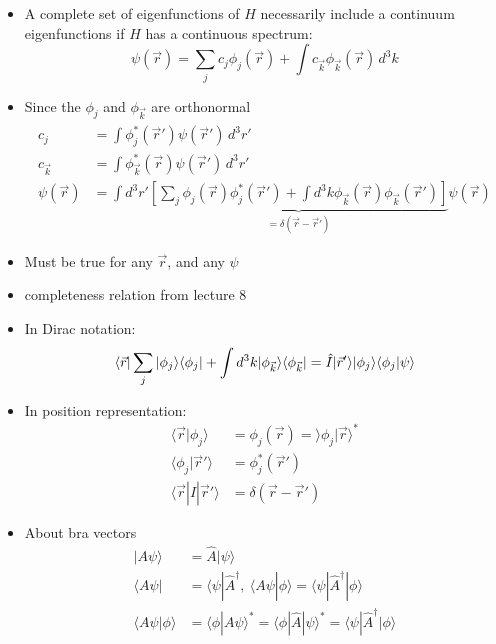 \documentclass[a4paper,11pt,normalem]{article}
\begin{document}
\begin{itemize}
\item
  A complete set of eigenfunctions of \(H\) necessarily include a
  continuum eigenfunctions if \(H\) has a continuous spectrum:
\[
    \psi(\vec{r}) = \sum_j c_j\phi_j(\vec{r}) + \int c_{\vec{k}}\phi_{\vec{k}}(\vec{r})\,d^3k
\]
\item
  Since the \(\phi_j\) and \(\phi_{\vec{k_{}}}\) are orthonormal
\[
    \begin{aligned}
    c_j &= \int \phi_j^*(\vec{r}')\psi(\vec{r}')\,d^3r' \\
    c_{\vec{k}} &= \int \phi_{\vec{k}}^*(\vec{r})\psi(\vec{r}')\,d^3r' \\
    \psi(\vec{r}) &= \int d^3r' \underbrace{\left[\sum_j \phi_j(\vec{r})\phi_j^*(\vec{r}') + \int d^3k \phi_{\vec{k}}(\vec{r})\phi_{\vec{k}}(\vec{r}')\right]}_{=\delta(\vec{r}-\vec{r}')}\psi(\vec{r})
    \end{aligned}
\]
\item
  Must be true for any \(\vec{r}\), and any \(\psi\)
\item
  completeness relation from lecture 8
\item
  In Dirac notation:
\[
    \langle\vec{r}|\sum_j|\phi_j\rangle\langle\phi_j| + \int d^3k |\phi_{\vec{k}}\rangle\langle\phi_{\vec{k}}| = \hat{I}|\vec{r}'\rangle|\phi_j\rangle \\
    \langle\phi_j|\psi\rangle
\]
\item
  In position representation:
\[
    \begin{aligned}
    \langle\vec{r}|\phi_j\rangle &= \phi_j(\vec{r}) = \rangle\phi_j|\vec{r}\rangle^* \\
    \langle\phi_j|\vec{r}'\rangle &= \phi_j^*(\vec{r}') \\
    \langle\vec{r}|\hat{I}|\vec{r}'\rangle &= \delta(\vec{r}-\vec{r}')
    \end{aligned}
\]
\item
  About bra vectors
\[
    \begin{aligned}
    |A\psi\rangle &= \hat{A}|\psi\rangle \\
    \langle A\psi| &= \langle\psi|\hat{A}^\dagger,~ \langle A\psi|\phi\rangle = \langle\psi|\hat{A}^\dagger|\phi\rangle \\
    \langle A\psi|\phi\rangle &= \langle\phi|A\psi\rangle^* = \langle\phi|\hat{A}|\psi\rangle^* = \langle\psi|\hat{A}^\dagger|\phi\rangle
    \end{aligned}
\]
\end{itemize}
\end{document}
